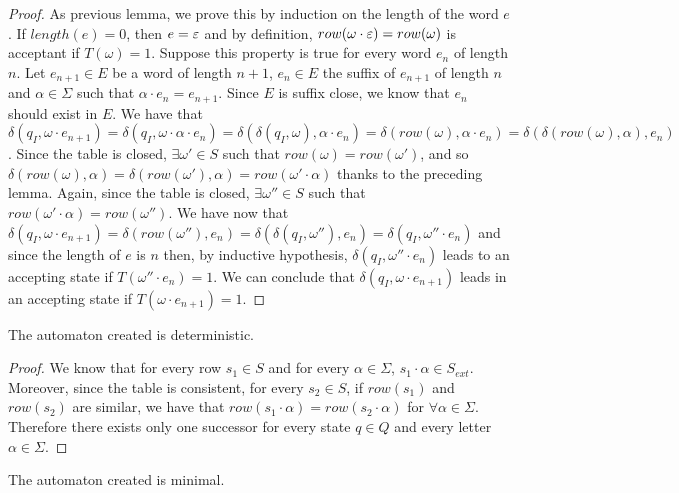 \begin{proof}
  As previous lemma, we prove this by induction on the length of the word $e$.
  If $length(e) = 0$, then $e = \varepsilon$ and by definition, $row(\omega \cdot \varepsilon) = row(\omega)$ is acceptant if $T(\omega) = 1$.
  Suppose this property is true for every word $e_n$ of length $n$.
  Let $e_{n+1} \in E$ be a word of length $n + 1$, $e_n \in E$ the suffix of $e_{n+1}$ of length $n$ and $\alpha \in \Sigma$ such that $\alpha \cdot e_n = e_{n+1}$. Since $E$ is suffix close, we know that $e_n$ should exist in $E$.
  We have that $\delta(q_I, \omega \cdot e_{n+1}) = \delta(q_I, \omega \cdot \alpha \cdot e_n) = \delta(\delta(q_I, \omega), \alpha \cdot e_n) = \delta(row(\omega), \alpha \cdot e_n) = \delta(\delta(row(\omega), \alpha), e_n)$.
  Since the table is closed, $\exists \omega' \in S$ such that $row(\omega) = row(\omega')$, and so $\delta(row(\omega), \alpha) = \delta(row(\omega'), \alpha) = row(\omega' \cdot \alpha)$ thanks to the preceding lemma. Again, since the table is closed, $\exists \omega'' \in S$ such that $row(\omega' \cdot \alpha) = row(\omega'')$.
  We have now that $\delta(q_I, \omega \cdot e_{n+1}) = \delta(row(\omega''), e_n) = \delta(\delta(q_I, \omega''), e_n) = \delta(q_I, \omega'' \cdot e_n)$ and since the length of $e$ is $n$ then, by inductive hypothesis, $\delta(q_I, \omega'' \cdot e_n)$ leads to an accepting state if $T(\omega'' \cdot e_n) = 1$.
  We can conclude that $\delta(q_I, \omega \cdot e_{n+1})$ leads in an accepting state if $T(\omega \cdot e_{n+1}) = 1$.
\end{proof}

\begin{lemma}
  The automaton created is deterministic.
\end{lemma}

\begin{proof}
  We know that for every row $s_1 \in S$ and for every $\alpha \in \Sigma$, $s_1 \cdot \alpha \in S_{ext}$. Moreover, since the table is consistent, for every $s_2 \in S$, if $row(s_1)$ and $row(s_2)$ are similar, we have that $row(s_1 \cdot \alpha) = row(s_2 \cdot \alpha)$ for $\forall \alpha \in \Sigma$. Therefore there exists only one successor for every state $q \in Q$ and every letter $\alpha \in \Sigma$.
\end{proof}

\begin{lemma}
  \label{lemma:mDFA}
  The automaton created is minimal.
\end{lemma}

